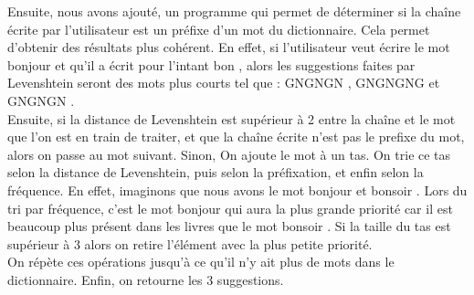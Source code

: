 \documentclass[a4paper, 11pt]{report}
\begin{document}
{Ensuite, nous avons ajouté, un programme qui permet de déterminer si la chaîne écrite par l'utilisateur est un préfixe d'un mot du dictionnaire. Cela permet d'obtenir des résultats plus cohérent. En effet, si l'utilisateur veut écrire le mot \og bonjour \fg et qu'il a écrit pour l'intant \og bon \fg, alors les suggestions faites par Levenshtein seront des mots plus courts tel que : \og GNGNGN \fg, \og GNGNGNG \fg et \og GNGNGN \fg. \\

Ensuite, si la distance de Levenshtein est supérieur à 2 entre la chaîne et le mot que l'on est en train de traiter, et que la chaîne écrite n'est pas le prefixe du mot, alors on passe au mot suivant. Sinon, On ajoute le mot à un tas. On trie ce tas selon la distance de Levenshtein, puis selon la préfixation, et enfin selon la fréquence. En effet, imaginons que nous avons le mot \og bonjour \fg et \og bonsoir \fg. Lors du tri par fréquence, c'est le mot \og bonjour \fg qui aura la plus grande priorité car il est beaucoup plus présent dans les livres que le mot \og bonsoir \fg. 
Si la taille du tas est supérieur à 3 alors on retire l'élément avec la plus petite priorité. \\

On répète ces opérations jusqu'à ce qu'il n'y ait plus de mots dans le dictionnaire. Enfin, on retourne les 3 suggestions. 


}
\end{document}
